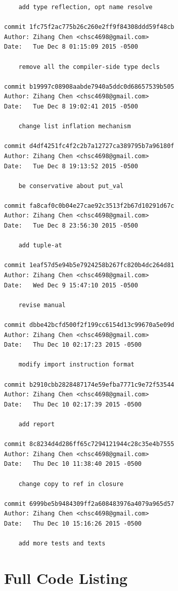 \documentclass{report}
\begin{document}
\begin{appendices}
\begin{verbatim}
    add type reflection, opt name resolve

commit 1fc75f2ac775b26c260e2ff9f84308ddd59f48cb
Author: Zihang Chen <chsc4698@gmail.com>
Date:   Tue Dec 8 01:15:09 2015 -0500

    remove all the compiler-side type decls

commit b19997c08908aabde7940a5ddc0d68657539b505
Author: Zihang Chen <chsc4698@gmail.com>
Date:   Tue Dec 8 19:02:41 2015 -0500

    change list inflation mechanism

commit d4df4251fc4f2c2b7a12727ca389795b7a96180f
Author: Zihang Chen <chsc4698@gmail.com>
Date:   Tue Dec 8 19:13:52 2015 -0500

    be conservative about put_val

commit fa8caf0c0b04e27cae92c3513f2b67d10291d67c
Author: Zihang Chen <chsc4698@gmail.com>
Date:   Tue Dec 8 23:56:30 2015 -0500

    add tuple-at

commit 1eaf57d5e94b5e7924258b267fc820b4dc264d81
Author: Zihang Chen <chsc4698@gmail.com>
Date:   Wed Dec 9 15:47:10 2015 -0500

    revise manual

commit dbbe42bcfd500f2f199cc6154d13c99670a5e09d
Author: Zihang Chen <chsc4698@gmail.com>
Date:   Thu Dec 10 02:17:23 2015 -0500

    modify import instruction format

commit b2910cbb2828487174e59efba7771c9e72f53544
Author: Zihang Chen <chsc4698@gmail.com>
Date:   Thu Dec 10 02:17:39 2015 -0500

    add report

commit 8c8234d4d286ff65c7294121944c28c35e4b7555
Author: Zihang Chen <chsc4698@gmail.com>
Date:   Thu Dec 10 11:38:40 2015 -0500

    change copy to ref in closure

commit 6999be5b9484309ff2a608483976a4079a965d57
Author: Zihang Chen <chsc4698@gmail.com>
Date:   Thu Dec 10 15:16:26 2015 -0500

    add more tests and texts
\end{verbatim}

\chapter{Full Code Listing}



\end{appendices}
\end{document}
